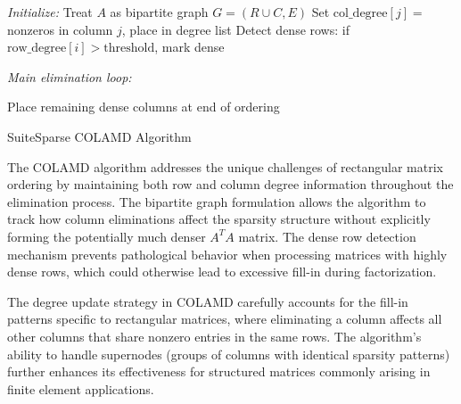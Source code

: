 \begin{algorithm}
    
    \BlankLine
    
    \emph{Initialize:}\;
    Treat $A$ as bipartite graph $G = (R \cup C, E)$\;
    Set $\text{col\_degree}[j] = $ nonzeros in column $j$, place in degree list\;
    Detect dense rows: if $\text{row\_degree}[i] > \text{threshold}$, mark dense\;
    \BlankLine
    
    \emph{Main elimination loop:}\;
    
    Place remaining dense columns at end of ordering\;
    \;
    
    \caption{SuiteSparse COLAMD Algorithm}
    \label{alg:colamd}
\end{algorithm}

The COLAMD algorithm addresses the unique challenges of rectangular matrix ordering by maintaining both row and column degree information throughout the elimination process. The bipartite graph formulation allows the algorithm to track how column eliminations affect the sparsity structure without explicitly forming the potentially much denser $A^T A$ matrix. The dense row detection mechanism prevents pathological behavior when processing matrices with highly dense rows, which could otherwise lead to excessive fill-in during factorization.

The degree update strategy in COLAMD carefully accounts for the fill-in patterns specific to rectangular matrices, where eliminating a column affects all other columns that share nonzero entries in the same rows. The algorithm's ability to handle supernodes (groups of columns with identical sparsity patterns) further enhances its effectiveness for structured matrices commonly arising in finite element applications.

